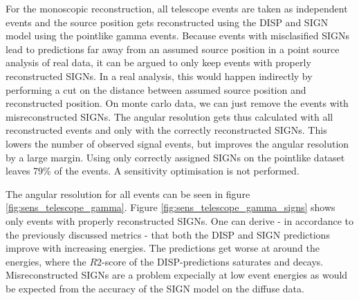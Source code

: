 For the monoscopic reconstruction, all telescope events are taken as independent events and
the source position gets reconstructed using the DISP and SIGN model using the
pointlike gamma events.
Because events with misclasified SIGNs lead to predictions far away
from an assumed source position in a point source analysis of real data,
it can be argued to only keep events with properly reconstructed SIGNs.
In a real analysis, this would happen indirectly by performing a cut on 
the distance between assumed source position and reconstructed position.
On monte carlo data, we can just remove the events with misreconstructed SIGNs.
The angular resolution gets thus calculated with all reconstructed events and only with
the correctly reconstructed SIGNs.
This lowers the number of observed signal events,
but improves the angular resolution by a large margin.
Using only correctly assigned SIGNs on the pointlike dataset leaves 79\% of the events.
A sensitivity optimisation is not performed.

The angular resolution for all events
can be seen in figure \ref{fig:sens_telescope_gamma}.
Figure \ref{fig:sens_telescope_gamma_signs} shows only events with properly reconstructed SIGNs.
One can derive - in accordance to the previously discussed metrics - 
that both the DISP and SIGN predictions improve with increasing energies.
The predictions get worse at around the energies, where the $R2$-score
of the DISP-predictions saturates and decays.
Misreconstructed SIGNs are a problem expecially at low event energies as would be
expected from the accuracy of the SIGN model on the diffuse data.


